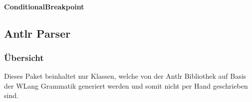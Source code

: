 \documentclass[parskip=full]{scrartcl}
\begin{document}
\paragraph{ConditionalBreakpoint}

\subsection{Antlr Parser}
\subsubsection{Übersicht}
Dieses Paket beinhaltet nur Klassen, welche von der Antlr Bibliothek auf Basis der WLang Grammatik generiert werden und somit nicht per Hand geschrieben sind.
\end{document}
